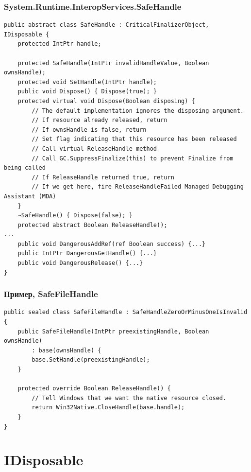 \documentclass[xetex,mathserif,serif]{beamer}
\begin{document}
	\begin{frame}[fragile]
		\frametitle{System.Runtime.InteropServices.SafeHandle}
		\begin{scriptsize}
			\begin{verbatim}
public abstract class SafeHandle : CriticalFinalizerObject, IDisposable {
    protected IntPtr handle;

    protected SafeHandle(IntPtr invalidHandleValue, Boolean ownsHandle);
    protected void SetHandle(IntPtr handle);
    public void Dispose() { Dispose(true); }
    protected virtual void Dispose(Boolean disposing) {
        // The default implementation ignores the disposing argument.
        // If resource already released, return
        // If ownsHandle is false, return
        // Set flag indicating that this resource has been released
        // Call virtual ReleaseHandle method
        // Call GC.SuppressFinalize(this) to prevent Finalize from being called
        // If ReleaseHandle returned true, return
        // If we get here, fire ReleaseHandleFailed Managed Debugging Assistant (MDA)
    }
    ~SafeHandle() { Dispose(false); }
    protected abstract Boolean ReleaseHandle();
...
    public void DangerousAddRef(ref Boolean success) {...}
    public IntPtr DangerousGetHandle() {...}
    public void DangerousRelease() {...}
}
			\end{verbatim}
		\end{scriptsize}
	\end{frame}

	\begin{frame}[fragile]
		\frametitle{Пример, SafeFileHandle}
		\begin{scriptsize}
			\begin{verbatim}
public sealed class SafeFileHandle : SafeHandleZeroOrMinusOneIsInvalid {
    public SafeFileHandle(IntPtr preexistingHandle, Boolean ownsHandle)
        : base(ownsHandle) {
        base.SetHandle(preexistingHandle);
    }

    protected override Boolean ReleaseHandle() {
        // Tell Windows that we want the native resource closed.
        return Win32Native.CloseHandle(base.handle);
    }
}
			\end{verbatim}
		\end{scriptsize}
	\end{frame}

	\section{IDisposable}
\end{document}
